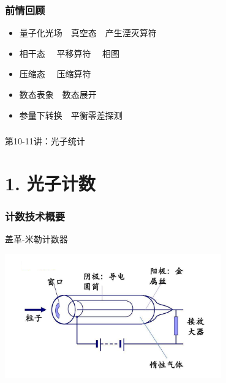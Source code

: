 

\begin{frame}
    \frametitle{前情回顾}
    \begin{itemize}
        \item 量子化光场~~真空态~~产生湮灭算符 
        \item 相干态~~ 平移算符 ~~相图
        \item 压缩态~~ 压缩算符
        \item 数态表象~~数态展开
        \item 参量下转换~~平衡零差探测 
    \end{itemize}     
\end{frame}

\begin{frame} [plain]
    \frametitle{}
    \Background[1] 
    \begin{center}
    {\huge 第10-11讲：光子统计}
    \end{center}  
    \addtocounter{framenumber}{-1}   
\end{frame}

\section{1. 光子计数}

\begin{frame}
 \frametitle{计数技术概要}
    {\Bullet} 盖革-米勒计数器
    \begin{center}
        \includegraphics[width=0.7\textwidth]{figs/16.png}
    \end{center}  
\end{frame}

